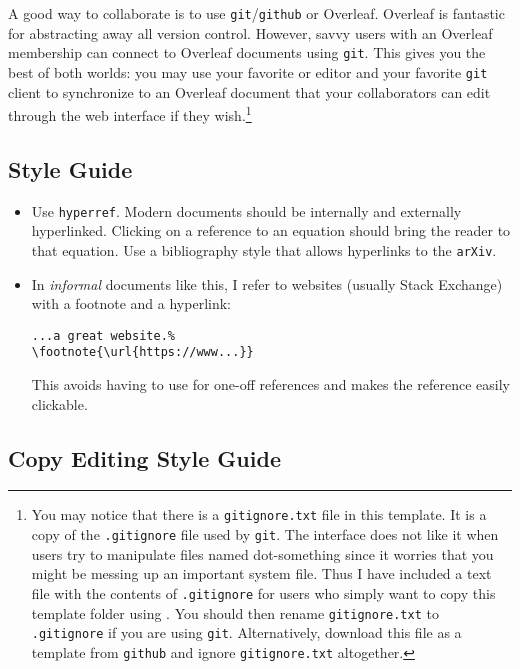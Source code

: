 A good way to collaborate is to use \texttt{git}/\texttt{github} or {Overleaf}. Overleaf is fantastic for abstracting away all version control. However, savvy users with an Overleaf membership can connect to Overleaf documents using \texttt{git}. This gives you the best of both worlds: you may use your favorite  or \LaTeXx editor and your favorite \texttt{git} client to synchronize to an Overleaf document that your collaborators can edit through the web interface if they wish.\footnote{You may notice that there is a \texttt{gitignore.txt} file in this template. It is a copy of the \texttt{.gitignore} file used by \texttt{git}. The  interface does not like it when users try to manipulate files named dot-something since it worries that you might be messing up an important system file. Thus I have included a text file with the contents of \texttt{.gitignore} for users who simply want to copy this template folder using . You should then rename \texttt{gitignore.txt} to \texttt{.gitignore} if you are using \texttt{git}. Alternatively, download this file as a template from \texttt{github} and ignore \texttt{gitignore.txt} altogether.  }

\subsection{\texorpdfstring{\LaTeXx Style Guide}{LaTeX Style Guide}}

\begin{itemize}
	\item Use \texttt{hyperref}. Modern documents should be internally and externally hyperlinked. Clicking on a reference to an equation should bring the reader to that equation. Use a bibliography style that allows hyperlinks to the \texttt{arXiv}.
	\item In \emph{informal} documents like this, I refer to websites (usually Stack Exchange) with a footnote and a hyperlink:
\begin{lstlisting}[style=latexstyle]
...a great website.%
\footnote{\url{https://www...}}
\end{lstlisting}
	This avoids having to use \BibTeX for one-off references and makes the reference easily clickable. 
\end{itemize}


\subsection{Copy Editing Style Guide}

